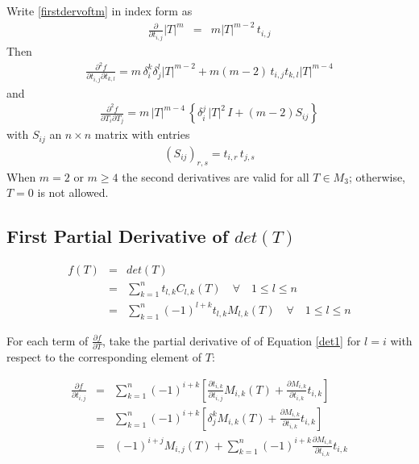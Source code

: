 \documentclass{report}
\begin{document}
 \newline

\noindent Write \ref{firstdervoftm} in index form as
\begin{eqnarray}
\frac{\partial}{\partial t_{i,j}} |T|^m & = & m |T|^{m-2} \, t_{i,j}
\end{eqnarray}
Then
\begin{eqnarray}
\frac{\partial^2 f}{\partial t_{i,j} \partial t_{k,l}} = m \, \delta_i^k \delta_j^l |T|^{m-2} + m (m-2) \, t_{i,j} t_{k,l} |T|^{m-4}
\end{eqnarray}
and 
\begin{eqnarray}
\frac{\partial^2 f}{\partial T_i \partial T_j} = m \,  |T|^{m-4} \, \left\{ \delta_i^j \, |T|^2 \, I + (m-2) S_{ij} \right\} 
\end{eqnarray}
with $S_{ij}$ an $n \times n$ matrix with entries
\begin{eqnarray}
\left( S_{ij} \right)_{r,s} = t_{i,r} \, t_{j,s}
\end{eqnarray}
When $m=2$ or $m \geq 4$ the second derivatives are valid for all $T \in M_3$;
otherwise, $T=0$ is not allowed. \newline

\subsection{First Partial Derivative of $det(T)$}

\begin{eqnarray}
f(T) &=& det(T) \\
     &=& \sum_{k=1}^n t_{l,k} C_{l,k}(T) \quad \forall \quad 1 \le l \le n \\
\label{det1}
     &=& \sum_{k=1}^n (-1)^{l+k} t_{l,k} M_{l,k}(T) \quad \forall \quad 1 \le l \le n
\end{eqnarray}

\noindent For each term of $\frac{\partial f}{\partial T}$, take the partial derivative of of Equation \ref{det1} for $l = i$ with respect to the corresponding element of $T$:

\begin{eqnarray}
\frac{\partial f}{\partial t_{i,j}} &=& 
\sum_{k=1}^n (-1)^{i+k} \left[
 \frac{\partial t_{i,k}}{\partial t_{i,j}} M_{i,k}(T) + 
 \frac{\partial M_{i,k}}{\partial t_{i,k}} t_{i,k} \right] \\
 &=& \sum_{k=1}^n (-1)^{i+k} \left[
 \delta^k_j M_{i,k}(T) + 
 \frac{\partial M_{i,k}}{\partial t_{i,k}} t_{i,k} \right] \\
\label{det2}
 &=& (-1)^{i+j} M_{i,j}(T) + \sum_{k=1}^n (-1)^{i+k} \frac{\partial 
   M_{i,k}}{\partial t_{i,k}} t_{i,k}
\end{eqnarray}
\end{document}

